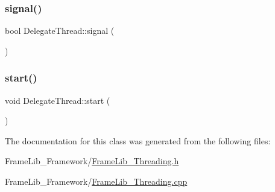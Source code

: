 \subsubsection{\texorpdfstring{signal()}{signal()}}
{\footnotesize\ttfamily bool Delegate\+Thread\+::signal (\begin{DoxyParamCaption}{ }\end{DoxyParamCaption})}

\mbox{\label{class_delegate_thread_a45a890ecb21c6e560ff9e391837453ad}} 
\subsubsection{\texorpdfstring{start()}{start()}}
{\footnotesize\ttfamily void Delegate\+Thread\+::start (\begin{DoxyParamCaption}{ }\end{DoxyParamCaption})\hspace{0.3cm}{\ttfamily [inline]}}



The documentation for this class was generated from the following files\+:\begin{DoxyCompactItemize}
\item 
Frame\+Lib\+\_\+\+Framework/\hyperlink{_frame_lib___threading_8h}{Frame\+Lib\+\_\+\+Threading.\+h}\item 
Frame\+Lib\+\_\+\+Framework/\hyperlink{_frame_lib___threading_8cpp}{Frame\+Lib\+\_\+\+Threading.\+cpp}\end{DoxyCompactItemize}
